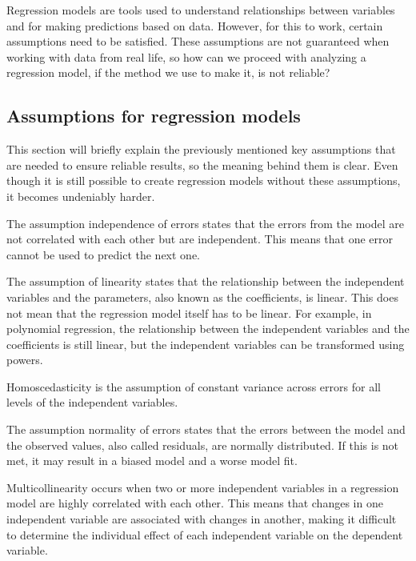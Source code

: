 Regression models are tools used to understand relationships between variables and for making predictions based on data. However, for this to work, certain assumptions need to be satisfied. 
These assumptions are not guaranteed when working with data from real life, so how can we proceed with analyzing a regression model, if the method we use to make it, is not reliable?


\subsection{Assumptions for regression models}

\noindent This section will briefly explain the previously mentioned key assumptions that are needed to ensure reliable results, so the meaning behind them is clear. Even though it is still possible to create regression models without these assumptions, it becomes undeniably harder.  \newline

\noindent The assumption independence of errors states that the errors from the model are not correlated with each other but are independent. This means that one error cannot be used to predict the next one. \newline


\noindent The assumption of linearity states that the relationship between the independent variables and the parameters, also known as the coefficients, is linear. This does not mean that the regression model itself has to be linear. For example, in polynomial regression, the relationship between the independent variables and the coefficients is still linear, but the independent variables can be transformed using powers.\newline


\noindent Homoscedasticity is the assumption of constant variance across errors for all levels of the independent variables. \newline

\noindent The assumption normality of errors states that the errors between the model and the observed values, also called residuals, are normally distributed. If this is not met, it may result in a biased model and a worse model fit. \newline


\noindent Multicollinearity occurs when two or more independent variables in a regression model are highly correlated with each other. This means that changes in one independent variable are associated with changes in another, making it difficult to determine the individual effect of each independent variable on the dependent variable. \newline

